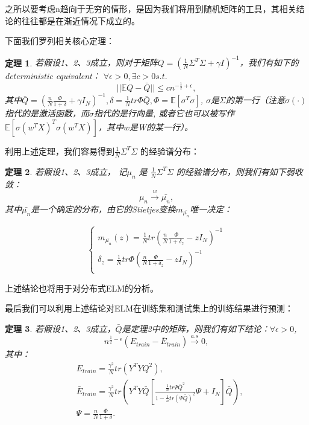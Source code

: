 \documentclass[UTF8,12pt]{ctexart}
\newtheorem{theorem}{定理}
\begin{document}
之所以要考虑n趋向于无穷的情形，是因为我们将用到随机矩阵的工具，其相关结论的往往都是在渐近情况下成立的。

下面我们罗列相关核心定理：
\begin{theorem}
    若假设1、2、3成立，则对于矩阵$Q = (\frac{1}{N}\Sigma^T \Sigma + \gamma I)^{-1}$，我们有如下的deterministic equivalent：
    $\forall \epsilon > 0, \exists c >0 s.t. $
    \begin{equation}
        ||\mathbb EQ - \bar Q|| \le cn^{-\frac{1}{2} + \epsilon},
    \end{equation}
    其中$\bar Q = (\frac{n}{N}\frac{\Phi}{1+\delta} + \gamma I_N)^{-1}, \delta = \frac{1}{N}tr\Phi\bar Q, \Phi = \mathbb E[\sigma^T \sigma]$, $\sigma$是$\Sigma$的第一行（注意$\sigma(\cdot)$指代的是激活函数，而$\sigma$指代的是行向量, 或者它也可以被写作$\mathbb E[\sigma(w^T X)^T \sigma(w^T X)]$，其中$w$是W的某一行）。
\end{theorem}

利用上述定理，我们容易得到$\frac{1}{N} \Sigma^T \Sigma$ 的经验谱分布：

\begin{theorem}
    若假设1、2、3成立， 记$\mu_n$ 是 $\frac{1}{N} \Sigma^T \Sigma$ 的经验谱分布，则我们有如下弱收敛：
    \begin{equation}
        \mu_n \stackrel{w}{\rightarrow} \bar{\mu_n},
    \end{equation}
    其中$\bar{\mu_n}$是一个确定的分布，由它的Stietjes变换$m_{\bar{\mu_n}}$唯一决定：

    $$
    \begin{cases}
        m_{\bar{\mu_n}}(z) = \frac{1}{N}tr {(\frac{n}{N} \frac{\Phi}{1+\delta_z} - z I_N)}^{-1} \\ \delta_z = \frac{1}{N}tr \Phi {(\frac{n}{N} \frac{\Phi}{1+\delta_z} - z I_N)}^{-1} \\
    \end{cases}
    $$
\end{theorem}

上述结论也将用于对分布式ELM的分析。

最后我们可以利用上述结论对ELM在训练集和测试集上的训练结果进行预测：

\begin{theorem}
    若假设1、2、3成立，$\bar Q$是定理2中的矩阵，则我们有如下结论：$\forall \epsilon > 0$,
    \begin{equation}
        n^{\frac{1}{2}-\epsilon}(E_{train} - \bar E_{train}) \stackrel{a.s}{\longrightarrow} 0,
    \end{equation}
    其中：
    \begin{align*}
        & E_{train} = \frac{\gamma^2}{N}tr (Y^T Y Q^2), \\
        & \bar E_{train} = \frac{\gamma^2}{N}tr (Y^T Y \bar{Q} 
        \left[
            \frac{\frac{1}{n}tr\Psi \bar{Q}^2}{1 - \frac{1}{n}tr{(\Psi \bar{Q})}^2} \Psi + I_N
        \right]
        \bar{Q}
        ), \\
        & \Psi = \frac{n}{N} \frac{\Phi}{1+\delta}.
    \end{align*}
\end{theorem}
\end{document}
